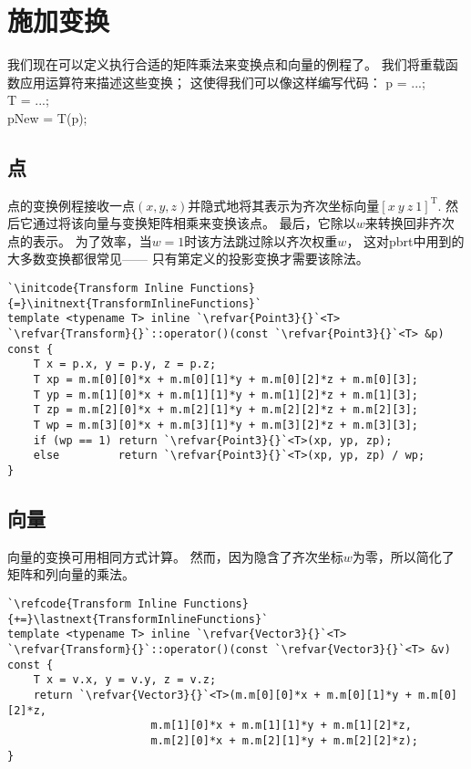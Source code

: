 \section{施加变换}\label{sec:施加变换}

我们现在可以定义执行合适的矩阵乘法来变换点和向量的例程了。
我们将重载函数应用运算符来描述这些变换；
这使得我们可以像这样编写代码：
{\ttfamily\indent {} p = ...;\\}
{\ttfamily\indent {} T = ...;\\}
{\ttfamily\indent {} pNew = T(p);}

\subsection{点}\label{sub:点}
点的变换例程接收一点$(x,y,z)$并隐式地将其表示为齐次坐标向量$[x\ y\ z\ 1]^\mathrm{T}$.
然后它通过将该向量与变换矩阵相乘来变换该点。
最后，它除以$w$来转换回非齐次点的表示。
为了效率，当$w=1$时该方法跳过除以齐次权重$w$，
这对pbrt中用到的大多数变换都很常见——
只有第定义的投影变换才需要该除法。
\begin{lstlisting}
`\initcode{Transform Inline Functions}{=}\initnext{TransformInlineFunctions}`
template <typename T> inline `\refvar{Point3}{}`<T>
`\refvar{Transform}{}`::operator()(const `\refvar{Point3}{}`<T> &p) const {
    T x = p.x, y = p.y, z = p.z;
    T xp = m.m[0][0]*x + m.m[0][1]*y + m.m[0][2]*z + m.m[0][3];
    T yp = m.m[1][0]*x + m.m[1][1]*y + m.m[1][2]*z + m.m[1][3];
    T zp = m.m[2][0]*x + m.m[2][1]*y + m.m[2][2]*z + m.m[2][3];
    T wp = m.m[3][0]*x + m.m[3][1]*y + m.m[3][2]*z + m.m[3][3];
    if (wp == 1) return `\refvar{Point3}{}`<T>(xp, yp, zp);
    else         return `\refvar{Point3}{}`<T>(xp, yp, zp) / wp;
}
\end{lstlisting}

\subsection{向量}\label{sub:向量}
向量的变换可用相同方式计算。
然而，因为隐含了齐次坐标$w$为零，所以简化了矩阵和列向量的乘法。
\begin{lstlisting}
`\refcode{Transform Inline Functions}{+=}\lastnext{TransformInlineFunctions}`
template <typename T> inline `\refvar{Vector3}{}`<T>
`\refvar{Transform}{}`::operator()(const `\refvar{Vector3}{}`<T> &v) const {
    T x = v.x, y = v.y, z = v.z;
    return `\refvar{Vector3}{}`<T>(m.m[0][0]*x + m.m[0][1]*y + m.m[0][2]*z,
                      m.m[1][0]*x + m.m[1][1]*y + m.m[1][2]*z,
                      m.m[2][0]*x + m.m[2][1]*y + m.m[2][2]*z);
}
\end{lstlisting}

